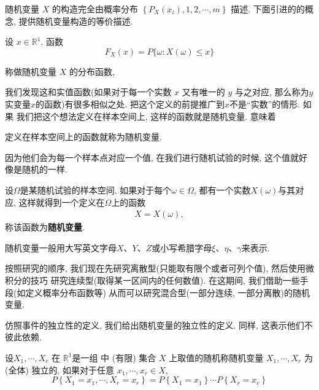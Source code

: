 随机变量 $X$ 的构造完全由概率分布 $\left\{P_{X}\left(x_i\right), 1,2, \cdots, m\right\}$ 描述. 下面引进的的概念, 提供随机变量构造的等价描述.

\begin{definition*}
    设 $x \in \mathbb{R}^1$. 函数
$$
F_{X}(x)=P\{\omega: X(\omega) \leq x\}
$$

称做随机变量 $X$ 的分布函数,
\end{definition*}

我们发现这和实值函数(如果对于每一个实数 $x$ 又有唯一的 $y$ 与之对应,
那么称为$y$ 实变量$x$的函数)有很多相似之处. 把这个定义的前提推广到$x$不是``实数''的情形. 如果
我们把这个想法定义在样本空间上, 这样的函数就是随机变量. 意味着

\begin{definition*}
    定义在样本空间上的函数就称为随机变量.
\end{definition*}

因为他们会为每一个样本点对应一个值, 在我们进行随机试验的时候, 这个值就好像是随机的一样.

\begin{definition}
    设$\Omega$是某随机试验的样本空间. 如果对于每个$\omega\in\Omega$, 都有一个实数$X(\omega)$与其对应, 这样就得到一个定义在$\Omega$上的函数
    \begin{align*}
        X=X(\omega),
    \end{align*}
    称该函数为\textbf{随机变量}.
\end{definition}

随机变量一般用大写英文字母$X$、$Y$、$Z$或小写希腊字母$\xi$、$\eta$、$\gamma$来表示. 

按照研究的顺序, 我们现在先研究离散型(只能取有限个或者可列个值), 然后使用微积分的技巧
研究连续型(取得某一区间内的任何数值). 在这期间, 我们借助一些手段(如定义概率分布函数等)
从而可以研究混合型(一部分连续, 一部分离散)的随机变量.




仿照事件的独立性的定义, 我们给出随机变量的独立性的定义. 同样, 这表示他们不彼此依赖. 

\begin{definition}
    设$X_1, \cdots, X_r$ 在 $\mathbb{R}^1$是一组  中 (有限) 集合 $X$ 上取值的随机称随机变量 $X_1, \cdots, X_r$ 为 (全体) 独立的, 如果对于任意 $x_1, \cdots, x_r \in X$,
$$
P\left\{X_1=x_1, \cdots, X_r=x_r\right\}=P\left\{X_1=x_1\right\} \cdots P\left\{X_r=x_r\right\}
$$
\end{definition}